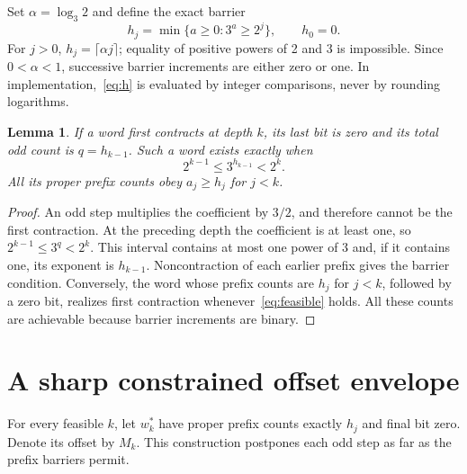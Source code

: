 \documentclass[11pt,a4paper]{amsart}
\newtheorem{lemma}[theorem]{Lemma}
\theoremstyle{definition}
\theoremstyle{remark}
\begin{document}
Set $\alpha=\log_3 2$ and define the exact barrier
\begin{equation}\label{eq:h}
h_j=\min\{a\ge0:3^a\ge2^j\},\qquad h_0=0.
\end{equation}
For $j>0$, $h_j=\lceil\alpha j\rceil$; equality of positive powers of 2
and 3 is impossible. Since $0<\alpha<1$, successive barrier increments
are either zero or one. In implementation,~\eqref{eq:h} is evaluated by
integer comparisons, never by rounding logarithms.

\begin{lemma}\label{lem:cross}
If a word first contracts at depth $k$, its last bit is zero and its total
odd count is $q=h_{k-1}$. Such a word exists exactly when
\begin{equation}\label{eq:feasible}
2^{k-1}\le3^{h_{k-1}}<2^k.
\end{equation}
All its proper prefix counts obey $a_j\ge h_j$ for $j<k$.
\end{lemma}
\begin{proof}
An odd step multiplies the coefficient by $3/2$, and therefore cannot be
the first contraction. At the preceding depth the coefficient is at
least one, so $2^{k-1}\le3^q<2^k$. This interval contains at most one
power of 3 and, if it contains one, its exponent is $h_{k-1}$.
Noncontraction of each earlier prefix gives the barrier condition.
Conversely, the word whose prefix counts are $h_j$ for $j<k$, followed
by a zero bit, realizes first contraction whenever~\eqref{eq:feasible}
holds. All these counts are achievable because barrier increments are
binary.
\end{proof}

\section{A sharp constrained offset envelope}
For every feasible $k$, let $w_k^*$ have proper prefix counts exactly
$h_j$ and final bit zero. Denote its offset by $M_k$. This construction
postpones each odd step as far as the prefix barriers permit.
\end{document}
